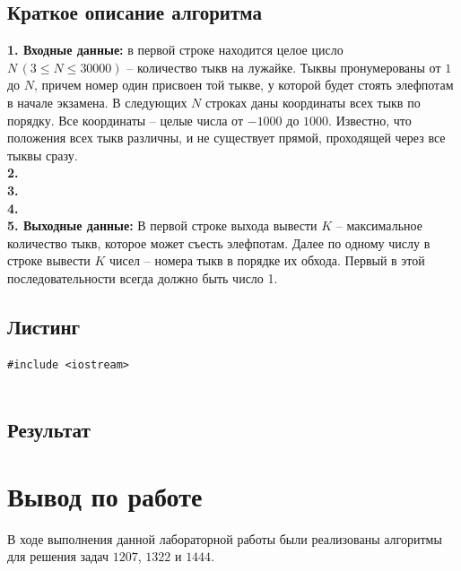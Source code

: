 \documentclass[a5paper, 10pt]{article}
\theoremstyle{definition}
\theoremstyle{plain}
\theoremstyle{remark}
\begin{document}
\subsection{Краткое описание алгоритма}
\textbf{1. Входные данные:} в первой строке находится целое цисло $N \, (3 \leq N \leq 30000)$ -- количество тыкв на лужайке. Тыквы пронумерованы от $1$ до $N$, причем номер один присвоен той тыкве, у которой будет стоять элефпотам в начале экзамена. В следующих $N$ строках даны координаты всех тыкв по порядку. Все координаты -- целые числа от $-1000$ до $1000$. Известно, что положения всех тыкв различны, и не существует прямой, проходящей через все тыквы сразу.\\
\textbf{2.} \\
\textbf{3.} \\
\textbf{4.} \\
\textbf{5. Выходные данные:} В первой строке выхода вывести $K$ -- максимальное количество тыкв, которое может съесть элефпотам. Далее по одному числу в строке вывести $K$ чисел -- номера тыкв в порядке их обхода. Первый в этой последовательности всегда должно быть число 1.

\subsection{Листинг}

\begin{center}
\begin{lstlisting}[label=some-code,caption={Исходный код для 1444}]
#include <iostream>


\end{lstlisting}
\end{center}

\subsection{Результат}


\newpage



\newpage
\section{Вывод по работе}
В ходе выполнения данной лабораторной работы были реализованы алгоритмы для решения задач $1207$, $1322$ и $1444$. 
\end{document}
